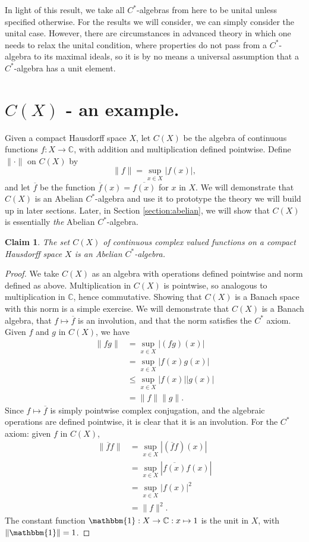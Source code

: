 \documentclass[12pt,a4paper]{report}
\theoremstyle{plain}
\newtheorem*{claim}{Claim}
\theoremstyle{definition}
\newcommand{\1}{\mathbbm{1}}
\newcommand{\C}{\mathbb{C}}
\newcommand{\CX}{C(X)}
\renewcommand{\bar}{\overline}
\begin{document}
In light of this result, we take all $C^\ast$-algebras from here to be unital unless
specified otherwise. For the results we will consider, we can simply consider the unital case. 
However, there are circumstances in advanced theory in which one needs to relax the unital 
condition, where properties do not pass from a $C^\ast$-algebra to its maximal ideals, so it is by no 
means a universal assumption that a $C^\ast$-algebra has a unit element.


\section{$\CX$ - an example.}
Given a compact Hausdorff space $X$, let $\CX$ be the algebra of continuous functions
$f:X\to\C$, with addition and multiplication defined pointwise. Define $\|\cdot\|$ on $\CX$ by
\[
	\|f\|= \sup_{x\in X}{|f(x)|},
\]
and let $\overline f$ be the function $\overline f(x) = \overline{f(x)}$ for $x$ in $X$.
We will demonstrate that $\CX$ is an Abelian $C^\ast$-algebra and use it to prototype the theory
we will build up in later sections. Later, in Section \ref{section:abelian}, we will show that $\CX$ is 
essentially \emph{the} Abelian $C^\ast$-algebra.

\begin{claim}
	The set $\CX$ of continuous complex valued functions on a compact Hausdorff space $X$ is an Abelian 
	$C^\ast$-algebra.
\end{claim}
\begin{proof}
	We take $\CX$ as an algebra with operations defined pointwise and norm defined as above.
	Multiplication in $\CX$ is pointwise, so analogous to multiplication in $\C$, hence commutative.
	Showing that $\CX$ is a Banach space with this norm is a simple exercise. We will demonstrate that $
	\CX$ is a Banach algebra, that $f\mapsto\overline{f}$ is an involution, and that the norm satisfies 
	the $C^\ast$ axiom.
	Given $f$ and $g$ in $\CX$, we have 
	\begin{align*}
				\|fg\| 
		&= 		\sup_{x\in X}|(fg)(x)|											\\
		&= 		\sup_{x\in X}|f(x)g(x)|											\\
		&\leq	\sup_{x\in X}|f(x)||g(x)|										\\
		&=		\|f\|\|g\|.
	\end{align*}
	Since $f\mapsto\overline{f}$ is simply pointwise complex conjugation, and the algebraic operations are defined pointwise, it is clear that it is an involution. For the $C^\ast$ axiom: given $f$ in $\CX$,
	\begin{align*}
				\|\bar f f\| 
		&= 		\sup_{x\in X}|(\bar f f)(x)|									\\
		&= 		\sup_{x\in X}|\bar{f(x)} f(x)|									\\
		&=		\sup_{x\in X}|f(x)|^2											\\
		&=		\|f\|^2.
	\end{align*}
	The constant function $\1:X\to\C:x\mapsto 1$ is the unit in $X$, with $\|\1\| = 1$.
\end{proof}
\end{document}
